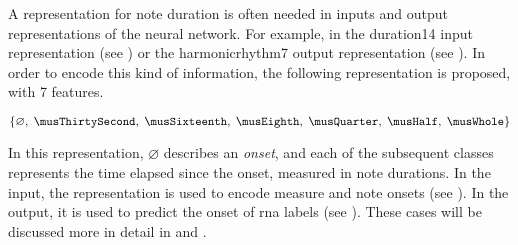 
A representation for note duration is often needed in inputs
and output representations of the neural network. For
example, in the \gls{duration14} input representation (see
) or the \gls{harmonicrhythm7} output
representation (see ). In
order to encode this kind of information, the following
representation is proposed, with 7 features.

\begin{equation}
    \{\varnothing,\; \musThirtySecond,\; \musSixteenth,\; \musEighth,\; 
    \musQuarter,\; \musHalf,\; \musWhole \}
\end{equation}

In this representation, $\varnothing$ describes an
\emph{onset}, and each of the subsequent classes represents
the time elapsed since the onset, measured in note
durations. In the input, the representation is used to
encode measure and note onsets (see
). In the output, it is
used to predict the onset of \gls{rna} labels (see
). These cases will be
discussed more in detail in
 and
.
